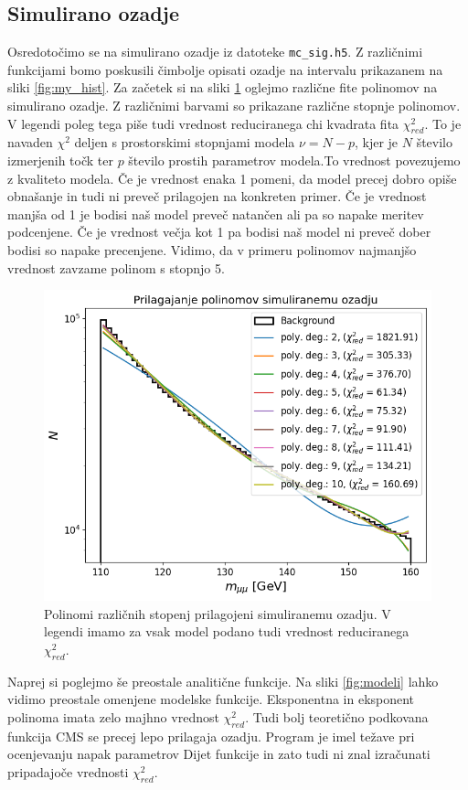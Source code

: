 \documentclass[slovene,11pt,a4paper]{article}
\begin{document}
\subsection{Simulirano ozadje}

Osredotočimo se na simulirano ozadje iz datoteke \texttt{mc\_sig.h5}. Z različnimi funkcijami bomo poskusili čimbolje opisati ozadje na intervalu prikazanem na sliki \ref{fig:my_hist}. Za začetek si na sliki \ref{fig:polinomi} oglejmo različne fite polinomov na simulirano ozadje. Z različnimi barvami so  prikazane različne stopnje polinomov. V legendi poleg tega piše tudi vrednost reduciranega chi kvadrata fita $\chi^2_{red}$. To je navaden $\chi^2$ deljen s prostorskimi stopnjami modela $\nu = N-p$, kjer je $N$ število izmerjenih točk ter $p$ število prostih parametrov modela.To vrednost povezujemo z kvaliteto modela. Če je vrednost enaka 1 pomeni, da model precej dobro opiše obnašanje in tudi ni preveč prilagojen na konkreten primer. Če je vrednost manjša od 1 je bodisi naš model preveč natančen ali pa so napake meritev podcenjene. Če je vrednost večja kot 1 pa bodisi naš model ni preveč dober bodisi so napake precenjene. Vidimo, da v primeru polinomov najmanjšo vrednost zavzame polinom s stopnjo 5.

\begin{figure}[h!]
    \centering
    \includegraphics[width=0.8\linewidth]{imgs/polinomi.png}
    \caption{Polinomi različnih stopenj prilagojeni simuliranemu ozadju. V legendi imamo za vsak model podano tudi vrednost reduciranega $\chi^2_{red}$.}
    \label{fig:polinomi}
\end{figure}

Naprej si poglejmo še preostale analitične funkcije. Na sliki \ref{fig:modeli} lahko vidimo preostale omenjene modelske funkcije. Eksponentna in eksponent polinoma imata zelo majhno vrednost $\chi^2_{red}$. Tudi bolj teoretično podkovana funkcija CMS se precej lepo prilagaja ozadju. Program je imel težave pri ocenjevanju napak parametrov Dijet funkcije in zato tudi ni znal izračunati pripadajoče vrednosti $\chi^2_{red}$.
\end{document}
